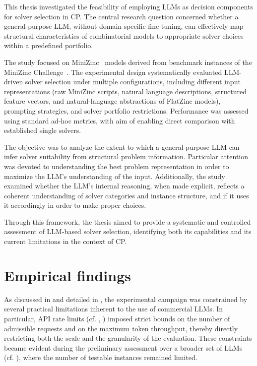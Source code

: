 \documentclass[../../main]{subfiles}
\begin{document}
This thesis investigated the feasibility of employing LLMs as decision components for solver selection in CP. The central research question concerned whether a general-purpose LLM, without domain-specific fine-tuning, can effectively map structural characteristics of combinatorial models to appropriate solver choices within a predefined portfolio.

The study focused on MiniZinc~\cite{MiniZinc} models derived from benchmark instances of the MiniZinc Challenge~\cite{MznProblems}. The experimental design systematically evaluated LLM-driven solver selection under multiple configurations, including different input representations (raw MiniZinc scripts, natural language descriptions, structured feature vectors, and natural-language abstractions of FlatZinc models), prompting strategies, and solver portfolio restrictions. Performance was assessed using standard ad-hoc metrics, with aim of enabling direct comparison with established single solvers.

The objective was to analyze the extent to which a general-purpose LLM can infer solver suitability from structural problem information. Particular attention was devoted to understanding the best problem representation in order to maximize the LLM's understanding of the input. Additionally, the study examined whether the LLM's internal reasoning, when made explicit, reflects a coherent understanding of solver categories and instance structure, and if it uses it accordingly in order to make proper choices.

Through this framework, the thesis aimed to provide a systematic and controlled assessment of LLM-based solver selection, identifying both its capabilities and its current limitations in the context of CP.

\section{Empirical findings}
As discussed in  and detailed in , the experimental campaign was constrained by several practical limitations inherent to the use of commercial LLMs. In particular, API rate limits (cf. , ) imposed strict bounds on the number of admissible requests and on the maximum token throughput, thereby directly restricting both the scale and the granularity of the evaluation. These constraints became evident during the preliminary assessment over a broader set of LLMs (cf. ), where the number of testable instances remained limited. 
\end{document}
